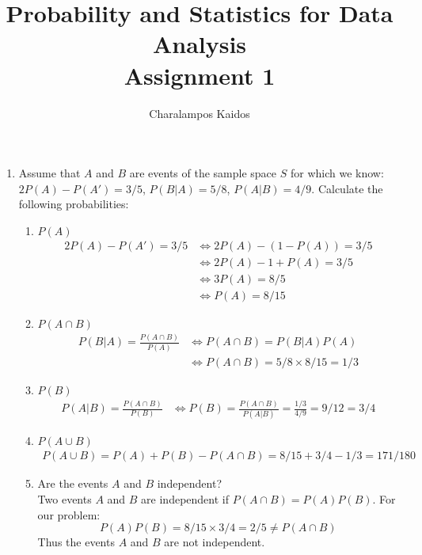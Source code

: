 \documentclass[a4paper]{article}
\begin{document}
\title{Probability and Statistics for Data Analysis\\Assignment 1}
\author{Charalampos Kaidos}

\maketitle

\begin{enumerate}

  \item Assume that $A$ and $B$ are events of the sample space $S$ for which we
  know: $2P(A)-P(A')=3/5$, $P(B|A)=5/8$, $P(A|B)=4/9$. Calculate the following
  probabilities:
    \begin{enumerate}
      \item $P(A)$
        \begin{align}
          2P(A)-P(A')=3/5& \Leftrightarrow 2P(A)-(1-P(A))=3/5 \nonumber\\
          & \Leftrightarrow 2P(A)-1+P(A)=3/5 \nonumber\\
          & \Leftrightarrow 3P(A)=8/5 \nonumber\\
          & \Leftrightarrow P(A)=8/15
        \end{align}
      \item $P(A\cap B)$
        \begin{align}
          P(B|A)=\frac{P(A\cap B)}{P(A)}& \Leftrightarrow P(A\cap
          B)=P(B|A)P(A) \nonumber \\
          & \Leftrightarrow P(A\cap B)=5/8\times8/15=1/3
        \end{align}
      \item $P(B)$
        \begin{align}
          P(A|B)=\frac{P(A\cap B)}{P(B)}& \Leftrightarrow P(B)=\frac{P(A\cap
          B)}{P(A|B)}=\frac{1/3}{4/9}=9/12=3/4
        \end{align}
      \item $P(A\cup B)$
        \begin{align}
          P(A\cup B)=P(A)+P(B)-P(A\cap B)=8/15+3/4-1/3=171/180
        \end{align}
      \item Are the events $A$ and $B$ independent? \\
      Two events $A$ and $B$ are independent if $P(A\cap B)=P(A)P(B)$. For our
      problem:
      $$P(A)P(B)=8/15\times3/4=2/5\neq P(A\cap B)$$
      Thus the events $A$ and $B$ are not independent.
    \end{enumerate}

\end{enumerate}
\end{document}
